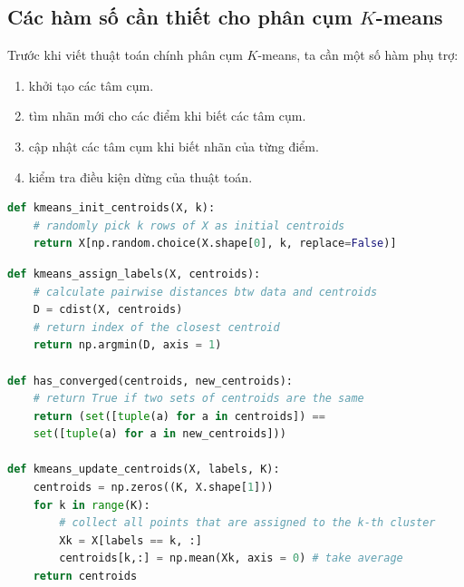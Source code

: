 



\subsection{Các hàm số cần thiết cho phân cụm $K$-means }
Trước khi viết thuật toán chính phân cụm $K$-means, ta cần một số hàm phụ
trợ:
\begin{enumerate}
\item {} khởi tạo các tâm cụm.

\item {} tìm nhãn mới cho các điểm khi
biết các tâm cụm.

\item {} cập nhật các tâm cụm khi
biết nhãn của từng điểm.

\item {} kiểm tra điều kiện dừng của thuật toán.
\end{enumerate}


\begin{lstlisting}[language=Python]
def kmeans_init_centroids(X, k):
    # randomly pick k rows of X as initial centroids
    return X[np.random.choice(X.shape[0], k, replace=False)]
\end{lstlisting}

\begin{lstlisting}[language=Python]
def kmeans_assign_labels(X, centroids):
    # calculate pairwise distances btw data and centroids
    D = cdist(X, centroids)
    # return index of the closest centroid
    return np.argmin(D, axis = 1)

def has_converged(centroids, new_centroids):
    # return True if two sets of centroids are the same
    return (set([tuple(a) for a in centroids]) ==
    set([tuple(a) for a in new_centroids]))

def kmeans_update_centroids(X, labels, K):
    centroids = np.zeros((K, X.shape[1]))
    for k in range(K):
        # collect all points that are assigned to the k-th cluster
        Xk = X[labels == k, :]
        centroids[k,:] = np.mean(Xk, axis = 0) # take average
    return centroids
\end{lstlisting}

